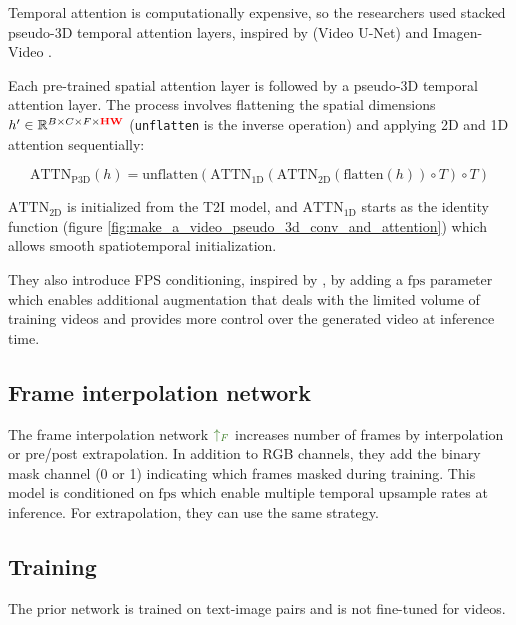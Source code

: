 Temporal attention is computationally expensive, so the researchers used stacked pseudo-3D temporal attention layers, inspired by \cite{video_diffusion_models} (Video U-Net) and Imagen-Video \cite{imagen_video}.

Each pre-trained spatial attention layer is followed by a pseudo-3D temporal attention layer. The process involves flattening the spatial dimensions $h' \in \mathbb{R}^{B\times C\times F\times \mathbf{\textcolor{red}{HW}}}$ (\texttt{unflatten} is the inverse operation) and applying 2D and 1D attention sequentially:

\[ \text{ATTN}_{\text{P3D}} (h) = \text{unflatten} 
(\text{ATTN}_{\text{1D}} 
(\text{ATTN}_{\text{2D}} 
(\text{flatten} (h)) \circ T) \circ T) 
\]

$\text{ATTN}_\text{2D}$ is initialized from the T2I model, and $\text{ATTN}_\text{1D}$ starts as the identity function (figure \ref{fig:make_a_video_pseudo_3d_conv_and_attention}) which allows smooth spatiotemporal initialization.

They also introduce FPS conditioning, inspired by \cite{cogvideo}, by adding a $\text{fps}$ parameter which enables additional augmentation that deals with the limited volume of training videos and provides more control over the generated video at inference time.







\subsection{Frame interpolation network}

The frame interpolation network $\textcolor{OliveGreen}{\uparrow_F}$ increases number of frames by interpolation or pre/post extrapolation. In addition to RGB channels, they add the binary mask channel (0 or 1) indicating which frames masked during training. This model is conditioned on $\text{fps}$ which enable multiple temporal upsample rates at inference. For extrapolation, they can use the same strategy.






\subsection{Training}

The prior network is trained on text-image pairs and is not fine-tuned for videos.

